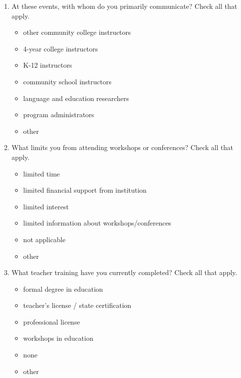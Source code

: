 \documentclass[letterpaper,10pt]{article}
\begin{document}
\begin{enumerate}[resume]
\item \label{ConfYes}At these events, with whom do you primarily communicate? Check all that apply.
\vspace{-0.1in}\begin{multicols}{2}
\begin{itemize}
	\item other community college instructors
	\item 4-year college instructors
	\item K-12 instructors
	\item community school instructors
	\item language and education researchers
	\item program administrators
	\item other \underline{\hspace{2in}}
\end{itemize}
\end{multicols}

\item \label{ConfNo}What limits you from attending workshops or conferences? Check all that apply.
\vspace{-0.1in}\begin{multicols}{2}
\begin{itemize}
	\item limited time
	\item limited financial support from institution
	\item limited interest
	\item limited information about workshops/conferences
	\item not applicable
	\item other \underline{\hspace{2in}}
\end{itemize}
\end{multicols}

\newpage
\item What teacher training have you currently completed? Check all that apply.
\vspace{-0.1in}\begin{multicols}{2}
\begin{itemize}
	\item formal degree in education
	\item teacher’s license / state certification
	\item professional license
	\item workshops in education
	\item none
	\item other \underline{\hspace{2in}}
\end{itemize}
\end{multicols}


\end{enumerate}
\end{document}
